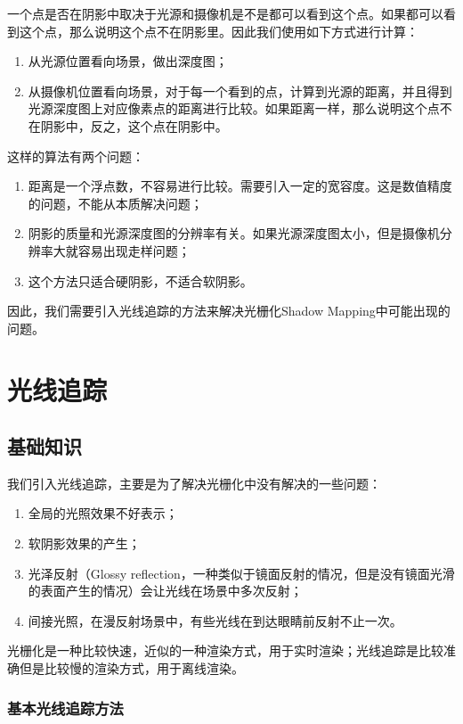 \documentclass[openany]{progbookcn}
\begin{document}
一个点是否在阴影中取决于光源和摄像机是不是都可以看到这个点。如果都可以看到这个点，那么说明这个点不在阴影里。因此我们使用如下方式进行计算：
\begin{enumerate}
	\item 从光源位置看向场景，做出深度图；
	\item 从摄像机位置看向场景，对于每一个看到的点，计算到光源的距离，并且得到光源深度图上对应像素点的距离进行比较。如果距离一样，那么说明这个点不在阴影中，反之，这个点在阴影中。
\end{enumerate}

这样的算法有两个问题：
\begin{enumerate}
	\item 距离是一个浮点数，不容易进行比较。需要引入一定的宽容度。这是数值精度的问题，不能从本质解决问题；
	\item 阴影的质量和光源深度图的分辨率有关。如果光源深度图太小，但是摄像机分辨率大就容易出现走样问题；
	\item 这个方法只适合硬阴影，不适合软阴影。
\end{enumerate}

因此，我们需要引入光线追踪的方法来解决光栅化Shadow Mapping中可能出现的问题。

\chapter{光线追踪}

\section{基础知识}

我们引入光线追踪，主要是为了解决光栅化中没有解决的一些问题：
\begin{enumerate}
	\item 全局的光照效果不好表示；
	\item 软阴影效果的产生；
	\item 光泽反射（Glossy reflection，一种类似于镜面反射的情况，但是没有镜面光滑的表面产生的情况）会让光线在场景中多次反射；
	\item 间接光照，在漫反射场景中，有些光线在到达眼睛前反射不止一次。
\end{enumerate}

光栅化是一种比较快速，近似的一种渲染方式，用于实时渲染；光线追踪是比较准确但是比较慢的渲染方式，用于离线渲染。

\subsection{基本光线追踪方法}
\end{document}
